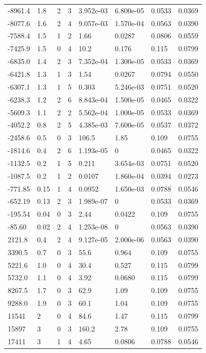 \documentclass[preview]{standalone}
\begin{document}
{{\begin{tabular}{L{1.2cm}C{1.2cm} C{0.3cm}C{0.5cm} C{1.4cm}C{1.4cm} C{1.4cm}C{1.4cm}}
  -8961.4  &   1.8  & 2     &  3 &  3.952e-03  & 6.800e-05  & 0.0533 &  0.0369   \\ 
  -8077.6  &   1.6  & 2     &  4 &  9.057e-03  & 1.570e-04  & 0.0563 &  0.0390   \\ 
  -7588.4  &   1.5  & 1     &  2 &  1.66  & 0.0287  & 0.0806 &  0.0559   \\ 
  -7425.9  &   1.5  & 0     &  4 &  10.2  & 0.176  & 0.115 &  0.0799   \\ 
  -6835.0  &   1.4  & 2     &  3 &  7.352e-04  & 1.300e-05  & 0.0533 &  0.0369   \\ 
  -6421.8  &   1.3  & 1     &  3 &  1.54  & 0.0267  & 0.0794 &  0.0550   \\ 
  -6307.1  &   1.3  & 1     &  5 &  0.303  & 5.246e-03  & 0.0751 &  0.0520   \\ 
  -6238.3  &   1.2  & 2     &  6 &  8.843e-04  & 1.500e-05  & 0.0465 &  0.0322   \\ 
  -5609.3  &   1.1  & 2     &  2 &  5.562e-04  & 1.000e-05  & 0.0533 &  0.0369   \\ 
  -4052.2  &   0.8  & 2     &  5 &  4.385e-03  & 7.600e-05  & 0.0537 &  0.0372   \\ 
  -2458.6  &   0.5  & 0     &  3 &  106.5  & 1.85  & 0.109 &  0.0755   \\ 
  -1814.6  &   0.4  & 2     &  6 &  1.193e-05  & 0  & 0.0465 &  0.0322   \\ 
  -1132.5  &   0.2  & 1     &  5 &  0.211  & 3.654e-03  & 0.0751 &  0.0520   \\ 
  -1087.5  &   0.2  & 1     &  2 &  0.0107  & 1.860e-04  & 0.0394 &  0.0273   \\ 
  -771.85  &  0.15  & 1     &  4 &  0.0952  & 1.650e-03  & 0.0788 &  0.0546   \\ 
  -652.19  &  0.13  & 2     &  3 &  1.989e-07  & 0  & 0.0533 &  0.0369   \\ 
  -195.54  &  0.04  & 0     &  3 &  2.44  & 0.0422  & 0.109 &  0.0755   \\ 
  -85.60  &  0.02  & 2     &  4 &  1.253e-08  & 0  & 0.0563 &  0.0390   \\ 
  2121.8  &   0.4  & 2     &  4 &  9.127e-05  & 2.000e-06  & 0.0563 &  0.0390   \\ 
  3390.5  &   0.7  & 0     &  3 &  55.6  & 0.964  & 0.109 &  0.0755   \\ 
  5221.6  &   1.0  & 0     &  4 &  30.4  & 0.527  & 0.115 &  0.0799   \\ 
  5732.0  &   1.1  & 0     &  4 &  3.92  & 0.0680  & 0.115 &  0.0799   \\ 
  8267.5  &   1.7  & 0     &  3 &  62.9  & 1.09  & 0.109 &  0.0755   \\ 
  9288.0  &   1.9  & 0     &  3 &  60.1  & 1.04  & 0.109 &  0.0755   \\ 
  11541  &     2  & 0     &  4 &  84.6  & 1.47  & 0.115 &  0.0799   \\ 
  15897  &     3  & 0     &  3 &  160.2  & 2.78  & 0.109 &  0.0755   \\ 
  17411  &     3  & 1     &  4 &  4.65  & 0.0806  & 0.0788 &  0.0546   \\ 
\hline 
\end{tabular} 

}}
\end{document}
